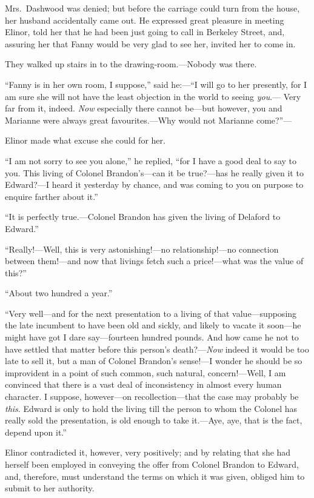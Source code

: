 \documentclass{article}
\begin{document}
Mrs.\ Dashwood was denied; but before the carriage could
turn from the house, her husband accidentally came out.
He expressed great pleasure in meeting Elinor, told her
that he had been just going to call in Berkeley Street,
and, assuring her that Fanny would be very glad to see her,
invited her to come in.

They walked up stairs in to the drawing-room.---Nobody was there.

``Fanny is in her own room, I suppose,'' said he:---``I
will go to her presently, for I am sure she will not
have the least objection in the world to seeing \emph{you}.---%
Very far from it, indeed.  \emph{Now} especially there
cannot be---but however, you and Marianne were always
great favourites.---Why would not Marianne come?''---%

Elinor made what excuse she could for her.

``I am not sorry to see you alone,'' he replied,
``for I have a good deal to say to you.  This living
of Colonel Brandon's---can it be true?---has he really given
it to Edward?---I heard it yesterday by chance, and was
coming to you on purpose to enquire farther about it.''

``It is perfectly true.---Colonel Brandon has given
the living of Delaford to Edward.''

``Really!---Well, this is very astonishing!---no
relationship!---no connection between them!---and now
that livings fetch such a price!---what was the value of this?''

``About two hundred a year.''

``Very well---and for the next presentation to a living
of that value---supposing the late incumbent to have
been old and sickly, and likely to vacate it soon---he
might have got I dare say---fourteen hundred pounds.
And how came he not to have settled that matter before this
person's death?---\emph{Now} indeed it would be too late to sell it,
but a man of Colonel Brandon's sense!---I wonder he should
be so improvident in a point of such common, such natural,
concern!---Well, I am convinced that there is a vast deal
of inconsistency in almost every human character.  I suppose,
however---on recollection---that the case may probably be \emph{this}.
Edward is only to hold the living till the person to whom
the Colonel has really sold the presentation, is old enough
to take it.---Aye, aye, that is the fact, depend upon it.''

Elinor contradicted it, however, very positively;
and by relating that she had herself been employed
in conveying the offer from Colonel Brandon to Edward,
and, therefore, must understand the terms on which it
was given, obliged him to submit to her authority.
\end{document}
